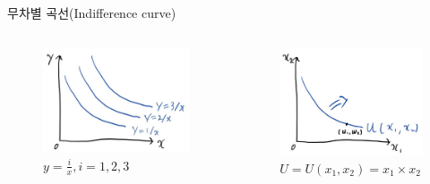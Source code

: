 \documentclass[aspectratio=169,xcolor=dvipsnames,handout]{beamer}
\begin{document}
\begin{frame}{무차별 곡선(Indifference curve)}
\begin{columns}
    \begin{column}{.5\textwidth}
        \begin{figure}
            \centering
            \includegraphics[scale=.3]{pic/IC1.jpg}
            \caption{$y=\frac{i}{x} , i = 1,2,3$}
        \end{figure}
    \end{column}    
    \begin{column}{.5\textwidth}
        \begin{figure}
            \centering
            \includegraphics[scale=.3]{pic/IC2.jpg}
            \caption{$U=U(x_1,x_2) = x_1 \times x_2$}
        \end{figure}
    \end{column}    
\end{columns}
\end{frame}
\end{document}
